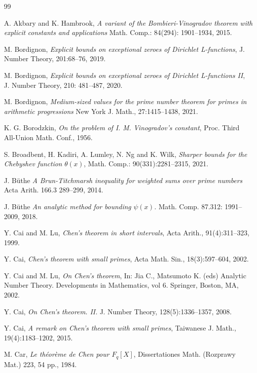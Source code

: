 \documentclass[12pt]{amsart}
\begin{document}
\newpage

\begin{thebibliography}{99}

A. Akbary and K. Hambrook,
\textit{A variant of the Bombieri-Vinogradov theorem with
explicit constants and applications}
Math. Comp.: 84(294): 1901--1934, 2015.
		
M. Bordignon, 
\textit{Explicit bounds on exceptional zeroes of Dirichlet L-functions},
J. Number Theory, 201:68--76, 2019.

M. Bordignon, 
\textit{Explicit bounds on exceptional zeroes of Dirichlet L-functions II},
J. Number Theory, 210: 481--487, 2020.

M. Bordignon, 
\textit{Medium-sized values for the prime number
theorem for primes in arithmetic
progressions}
New York J. Math., 27:1415--1438, 2021.

K. G. Borodzkin,
\textit{On the problem of I. M. Vinogradov's constant},
Proc. Third All-Union Math. Conf., 1956.

S. Broadbent, H. Kadiri, A. Lumley, N. Ng and K. Wilk, 
\textit{Sharper bounds for the Chebyshev function $\theta (x)$},
Math. Comp.: 90(331):2281--2315, 2021. 

J. B\"uthe
\textit{A Brun-Titchmarsh inequality for weighted sums over prime numbers}
Acta Arith. 166.3 289--299, 2014.

J. B\"uthe
\textit{An analytic method for bounding $\psi(x)$.}
Math. Comp. 87.312: 1991--2009, 2018.

Y. Cai and M. Lu, 
\textit{Chen's theorem in short intervals},
Acta Arith., 91(4):311--323, 1999. 

Y. Cai, 
\textit{Chen's theorem with small primes},
Acta Math. Sin., 18(3):597--604, 2002. 

Y. Cai and M. Lu,
\textit{On Chen's theorem},
 In: Jia C., Matsumoto K. (eds) Analytic Number Theory. Developments in Mathematics, vol 6. Springer, Boston, MA, 2002. 

Y. Cai,
\textit{On Chen's theorem. II.}
J. Number Theory, 128(5):1336--1357, 2008.

Y. Cai, 
\textit{A remark on Chen's theorem with small primes},
Taiwanese J. Math., 19(4):1183--1202, 2015.

M. Car, 
\textit{Le théorème de Chen pour $F_q[X]$},
Dissertationes Math. (Rozprawy Mat.) 223, 54 pp., 1984.


\end{thebibliography}
\end{document}
